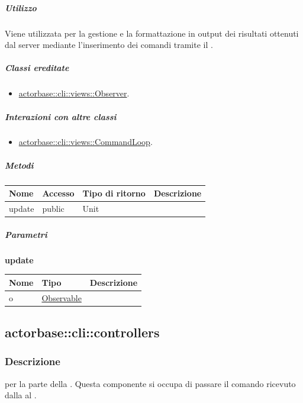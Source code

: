 \documentclass{scalatekids-article}
\begin{document}
\subparagraph{Utilizzo}

Viene utilizzata per la gestione e la formattazione in output dei risultati
ottenuti dal server mediante l'inserimento dei comandi tramite il
 .

\subparagraph{Classi ereditate}

\begin{itemize}
\item \hyperref[sec:actorbase::cli::views::Observer]{actorbase::cli::views::Observer}.
\end{itemize}

\subparagraph{Interazioni con altre classi}

\begin{itemize}
\item \hyperref[sec:actorbase::cli::views::CommandLoop]{actorbase::cli::views::CommandLoop}.
\end{itemize}

\subparagraph{Metodi}

\begin{tabular}{| l | l | l | l |}
	\hline
	Nome & Accesso & Tipo di ritorno & Descrizione\\
	\hline
	update & public & Unit & \\
	\hline
\end{tabular}

\subparagraph{Parametri}

\begin{center}
	\textbf{update}
\end{center}
\begin{tabular}{| l | l | l |}
	\hline
	Nome & Tipo & Descrizione\\
	\hline
	o & \hyperref[actorbase::cli::models::Observable]{Observable} & \\
	\hline
\end{tabular}

\subsection{actorbase::cli::controllers}
\label{sec:actorbase::cli::controllers}

\subsubsection{Descrizione}

 per la parte  della . Questa
componente si occupa di passare il comando ricevuto dalla  al
.
\end{document}
